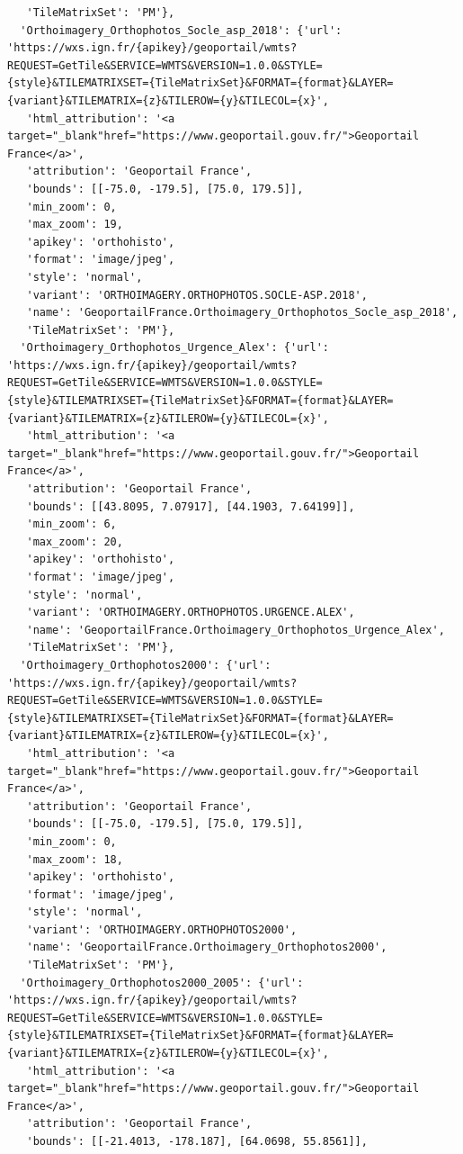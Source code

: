 \documentclass[
  letterpaper,
  DIV=11,
  numbers=noendperiod]{scrreprt}
\begin{document}
\begin{verbatim}
   'TileMatrixSet': 'PM'},
  'Orthoimagery_Orthophotos_Socle_asp_2018': {'url': 'https://wxs.ign.fr/{apikey}/geoportail/wmts?REQUEST=GetTile&SERVICE=WMTS&VERSION=1.0.0&STYLE={style}&TILEMATRIXSET={TileMatrixSet}&FORMAT={format}&LAYER={variant}&TILEMATRIX={z}&TILEROW={y}&TILECOL={x}',
   'html_attribution': '<a target="_blank"href="https://www.geoportail.gouv.fr/">Geoportail France</a>',
   'attribution': 'Geoportail France',
   'bounds': [[-75.0, -179.5], [75.0, 179.5]],
   'min_zoom': 0,
   'max_zoom': 19,
   'apikey': 'orthohisto',
   'format': 'image/jpeg',
   'style': 'normal',
   'variant': 'ORTHOIMAGERY.ORTHOPHOTOS.SOCLE-ASP.2018',
   'name': 'GeoportailFrance.Orthoimagery_Orthophotos_Socle_asp_2018',
   'TileMatrixSet': 'PM'},
  'Orthoimagery_Orthophotos_Urgence_Alex': {'url': 'https://wxs.ign.fr/{apikey}/geoportail/wmts?REQUEST=GetTile&SERVICE=WMTS&VERSION=1.0.0&STYLE={style}&TILEMATRIXSET={TileMatrixSet}&FORMAT={format}&LAYER={variant}&TILEMATRIX={z}&TILEROW={y}&TILECOL={x}',
   'html_attribution': '<a target="_blank"href="https://www.geoportail.gouv.fr/">Geoportail France</a>',
   'attribution': 'Geoportail France',
   'bounds': [[43.8095, 7.07917], [44.1903, 7.64199]],
   'min_zoom': 6,
   'max_zoom': 20,
   'apikey': 'orthohisto',
   'format': 'image/jpeg',
   'style': 'normal',
   'variant': 'ORTHOIMAGERY.ORTHOPHOTOS.URGENCE.ALEX',
   'name': 'GeoportailFrance.Orthoimagery_Orthophotos_Urgence_Alex',
   'TileMatrixSet': 'PM'},
  'Orthoimagery_Orthophotos2000': {'url': 'https://wxs.ign.fr/{apikey}/geoportail/wmts?REQUEST=GetTile&SERVICE=WMTS&VERSION=1.0.0&STYLE={style}&TILEMATRIXSET={TileMatrixSet}&FORMAT={format}&LAYER={variant}&TILEMATRIX={z}&TILEROW={y}&TILECOL={x}',
   'html_attribution': '<a target="_blank"href="https://www.geoportail.gouv.fr/">Geoportail France</a>',
   'attribution': 'Geoportail France',
   'bounds': [[-75.0, -179.5], [75.0, 179.5]],
   'min_zoom': 0,
   'max_zoom': 18,
   'apikey': 'orthohisto',
   'format': 'image/jpeg',
   'style': 'normal',
   'variant': 'ORTHOIMAGERY.ORTHOPHOTOS2000',
   'name': 'GeoportailFrance.Orthoimagery_Orthophotos2000',
   'TileMatrixSet': 'PM'},
  'Orthoimagery_Orthophotos2000_2005': {'url': 'https://wxs.ign.fr/{apikey}/geoportail/wmts?REQUEST=GetTile&SERVICE=WMTS&VERSION=1.0.0&STYLE={style}&TILEMATRIXSET={TileMatrixSet}&FORMAT={format}&LAYER={variant}&TILEMATRIX={z}&TILEROW={y}&TILECOL={x}',
   'html_attribution': '<a target="_blank"href="https://www.geoportail.gouv.fr/">Geoportail France</a>',
   'attribution': 'Geoportail France',
   'bounds': [[-21.4013, -178.187], [64.0698, 55.8561]],

\end{verbatim}
\end{document}

